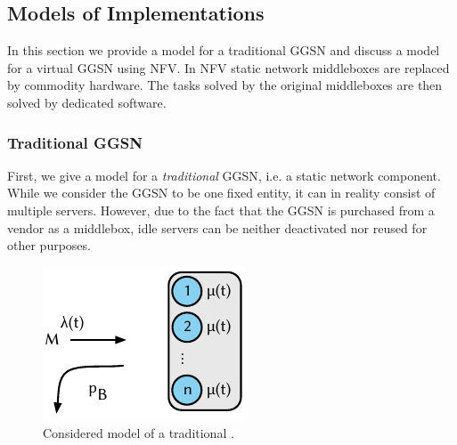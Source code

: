 \subsection{Models of  Implementations}\label{sec:cloud:virtualized_network_functions:model}

In this section we provide a model for a traditional \gls{GGSN} and discuss a model for a virtual \gls{GGSN} using \gls{NFV}.
In \gls{NFV} \cite{Nfv2013} static network middleboxes are replaced by commodity hardware.
The tasks solved by the original middleboxes are then solved by dedicated software.

\subsubsection*{Traditional GGSN}\label{sec:cloud:virtualized_network_functions:model:traditional_ggsn}
First, we give a model for a \emph{traditional} \gls{GGSN}, i.e. a static network component.
While we consider the \gls{GGSN} to be one fixed entity, it can in reality consist of multiple servers.
However, due to the fact that the \gls{GGSN} is purchased from a vendor as a middlebox, idle servers can be neither deactivated nor reused for other purposes.

\begin{figure}
  \centering
  \includegraphics{cloud/virtualized_network_functions/model/figures/traditional_ggsn}
  \caption{Considered model of a traditional .}
  \label{sec:cloud:virtualized_network_functions:model:traditional_ggsn:model}
\end{figure}

